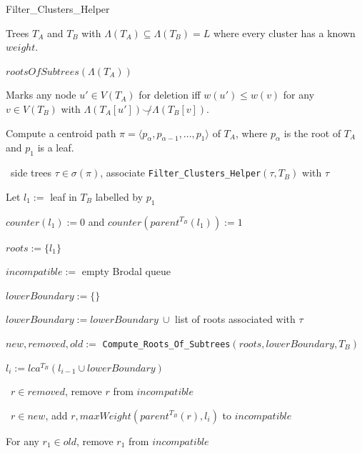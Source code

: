 \documentclass{article}
\newcommand{\compatible}{\smile}
\newcommand{\leafset}{\Lambda}
\begin{document}
    \begin{algorithm}
        \caption{Filter\_Clusters\_Helper}
        \label{alg:filterclustershelper}

        \begin{algorithmic}[1]
            \Input Trees $T_A$ and $T_B$ with $\leafset(T_A) \subseteq \leafset(T_B) = L$ where every cluster has a known $weight$.

            \Output $rootsOfSubtrees(\leafset(T_A))$

            \SideEffect Marks any node $u' \in V(T_A)$ for deletion iff $w(u') \leq w(v)$ for any $v \in V(T_B)$ with $\leafset(T_A[u']) \not\compatible \leafset(T_B[v])$.

            \State Compute a centroid path $\pi = \langle p_{\alpha}, p_{\alpha - 1}, ..., p_1 \rangle$ of $T_A$, where $p_{\alpha}$ is the root of $T_A$ and $p_1$ is a leaf.

            \State \algorithmicforall\ side trees $\tau \in \sigma(\pi)$,
                associate \texttt{Filter\_Clusters\_Helper}$(\tau, T_B)$ with $\tau$

            \State Let $l_1 :=$ leaf in $T_B$ labelled by $p_1$

            \State $counter(l_1) := 0$ and $counter(parent^{T_B}(l_1)) := 1$

            \State $roots := \{l_1\}$

            \State $incompatible :=$ empty Brodal queue

                \State $lowerBoundary := \{\}$

                    \State $lowerBoundary := lowerBoundary\ \cup$ list of roots associated with $\tau$
                \EndFor

                \State $new, removed, old :=$ \texttt{Compute\_Roots\_Of\_Subtrees}$(roots, lowerBoundary, T_B)$

                \State $l_i := lca^{T_B}(l_{i-1} \cup lowerBoundary)$

                \State \algorithmicforall\ $r \in removed$, remove $r$ from $incompatible$

                \State \algorithmicforall\ $r \in new$, add $r, maxWeight(parent^{T_B}(r), l_i)$ to $incompatible$

                    \State For any $r_1 \in old$, remove $r_1$ from $incompatible$


\end{algorithmic}
\end{algorithm}
\end{document}
